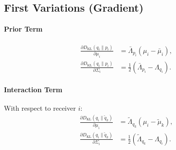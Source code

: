\documentclass[11pt]{article}
\begin{document}
\subsection{First Variations (Gradient)}

\paragraph{Prior Term}
\begin{align}
\frac{\partial D_{\mathrm{KL}}(q_i \| p_i)}{\partial \mu_i} &= \bar{\Lambda}_{p_i}(\mu_i - \bar{\mu}_i), \\
\frac{\partial D_{\mathrm{KL}}(q_i \| p_i)}{\partial \Sigma_i} &= \frac{1}{2}(\bar{\Lambda}_{p_i} - \Lambda_{q_i}).
\end{align}

\paragraph{Interaction Term}

With respect to receiver $i$:
\begin{align}
\frac{\partial D_{\mathrm{KL}}(q_i \| \tilde{q}_k)}{\partial \mu_i} &= \tilde{\Lambda}_{q_k}(\mu_i - \tilde{\mu}_k), \\
\frac{\partial D_{\mathrm{KL}}(q_i \| \tilde{q}_k)}{\partial \Sigma_i} &= \frac{1}{2}(\tilde{\Lambda}_{q_k} - \Lambda_{q_i}).
\end{align}
\end{document}
